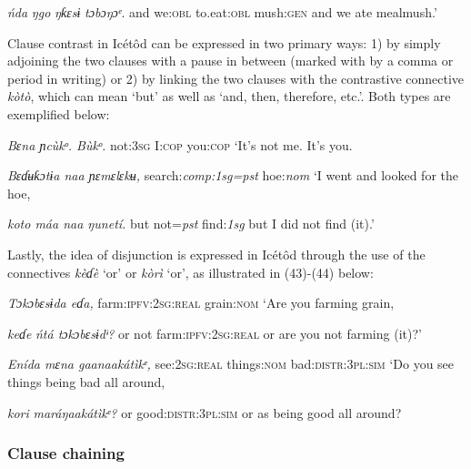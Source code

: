 \begin{table}
\textit{ńda}\textit{  }\textit{ŋgo}\textit{     }\textit{ŋƙɛsɨ}\textit{     }\textit{tɔbɔŋɔᵉ}.
and   we:\textsc{obl}   to.eat:\textsc{obl}   mush:\textsc{gen}
and we ate mealmush.’


Clause contrast in Icétôd can be expressed in two primary ways: 1) by simply adjoining the two clauses with a pause in between (marked with by a comma or period in writing) or 2) by linking the two clauses with the contrastive connective \textit{kòtò}, which can mean ‘but’ as well as ‘and, then, therefore, etc.’. Both types are exemplified below:



\textit{Bɛna     ɲcùkᵒ.     Bùkᵒ.}
not:\textsc{3sg}   I:\textsc{cop}     you:\textsc{cop}
‘It’s not me. It’s you.




\textit{Bɛɗʉƙɔtɨa naa     ɲɛmɛlɛkʉ,}
search:\textit{comp:1sg=pst}   hoe:\textit{nom}
‘I went and looked for the hoe,



\textit{koto   máa naa   ŋunetí.}
but   not=\textit{pst}   find:\textit{1sg}
but I did not find (it).’


Lastly, the idea of disjunction is expressed in Icétôd through the use of the connectives \textit{kèɗè }‘or’ or \textit{kòrì }‘or’, as illustrated in (43)-(44) below:



\textit{Tɔkɔbɛsɨda       eɗa, }
farm:\textsc{ipfv:2sg:real}   grain:\textsc{nom}
‘Are you farming grain,



\textit{keɗe}\textit{   ńtá   tɔkɔbɛsɨdᶤ?}
or   not   farm:\textsc{ipfv:2sg:real}
or are you not farming (it)?’




\textit{Enída       mɛna     gaanaakátìkᵉ,}
see:\textsc{2sg:real}   things:\textsc{nom}   bad:\textsc{distr:3pl:sim}
‘Do you see things being bad all around,



\textit{kori}\textit{   maráŋaakátìkᵉ?}
or   good:\textsc{distr:3pl:sim}
or as being good all around?




\subsubsection{Clause chaining}


\end{table}
